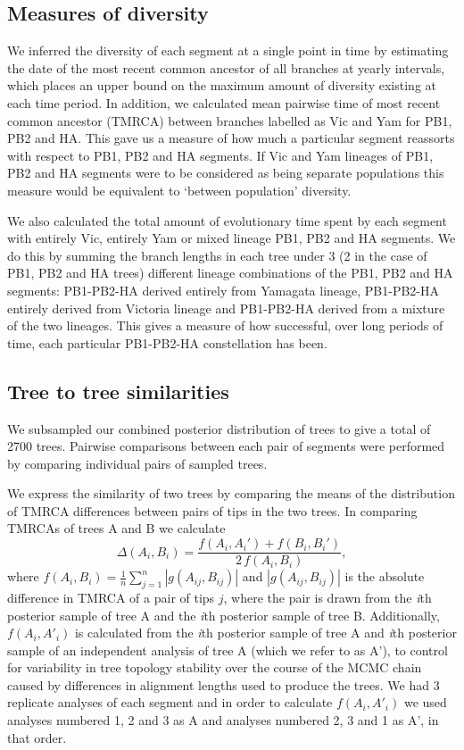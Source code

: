 \documentclass[11pt,oneside,letterpaper]{article}
\begin{document}
\subsection*{Measures of diversity}
We inferred the diversity of each segment at a single point in time by estimating the date of the most recent common ancestor of all branches at yearly intervals, which places an upper bound on the maximum amount of diversity existing at each time period.
In addition, we calculated mean pairwise time of most recent common ancestor (TMRCA) between branches labelled as Vic and Yam for PB1, PB2 and HA.
This gave us a measure of how much a particular segment reassorts with respect to PB1, PB2 and HA segments.
If Vic and Yam lineages of PB1, PB2 and HA segments were to be considered as being separate populations this measure would be equivalent to `between population' diversity.

We also calculated the total amount of evolutionary time spent by each segment with entirely Vic, entirely Yam or mixed lineage PB1, PB2 and HA segments.
We do this by summing the branch lengths in each tree under 3 (2 in the case of PB1, PB2 and HA trees) different lineage combinations of the PB1, PB2 and HA segments: PB1-PB2-HA derived entirely from Yamagata lineage, PB1-PB2-HA entirely derived from Victoria lineage and PB1-PB2-HA derived from a mixture of the two lineages.
This gives a measure of how successful, over long periods of time, each particular PB1-PB2-HA constellation has been.

\subsection*{Tree to tree similarities}
We subsampled our combined posterior distribution of trees to give a total of 2700 trees.
Pairwise comparisons between each pair of segments were performed by comparing individual pairs of sampled trees.

We express the similarity of two trees by comparing the means of the distribution of TMRCA differences between pairs of tips in the two trees.
In comparing TMRCAs of trees A and B we calculate
\begin{equation}
\Delta(A_i, B_i) = \frac{f(A_i, A_i') + f(B_i, B_i')}{2 \, f(A_i, B_i)},
\end{equation}
where $f(A_i, B_i) = \frac{1}{n}\sum_{j=1}^n |g(A_{ij}, B_{ij})|$ and $|g(A_{ij},B_{ij})|$ is the absolute difference in TMRCA of a pair of tips $j$, where the pair is drawn from the \textit{i}th posterior sample of tree A and the \textit{i}th posterior sample of tree B.
Additionally, $f(A_i,A'_i)$ is calculated from the \textit{i}th posterior sample of tree A and \textit{i}th posterior sample of an independent analysis of tree A (which we refer to as A'), to control for variability in tree topology stability over the course of the MCMC chain caused by differences in alignment lengths used to produce the trees.
We had 3 replicate analyses of each segment and in order to calculate $f(A_i,A'_i)$ we used analyses numbered 1, 2 and 3 as A and analyses numbered 2, 3 and 1 as A', in that order.
\end{document}
